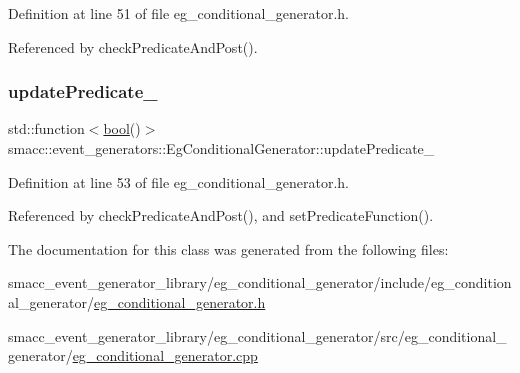 Definition at line 51 of file eg\+\_\+conditional\+\_\+generator.\+h.



Referenced by check\+Predicate\+And\+Post().

\mbox{\label{classsmacc_1_1event__generators_1_1EgConditionalGenerator_a4e4092ecfa7278deda39e8ade6455362}} 
\subsubsection{\texorpdfstring{update\+Predicate\+\_\+}{updatePredicate\_}}
{\footnotesize\ttfamily std\+::function$<$\hyperlink{classbool}{bool}()$>$ smacc\+::event\+\_\+generators\+::\+Eg\+Conditional\+Generator\+::update\+Predicate\+\_\+\hspace{0.3cm}{\ttfamily [private]}}



Definition at line 53 of file eg\+\_\+conditional\+\_\+generator.\+h.



Referenced by check\+Predicate\+And\+Post(), and set\+Predicate\+Function().



The documentation for this class was generated from the following files\+:\begin{DoxyCompactItemize}
\item 
smacc\+\_\+event\+\_\+generator\+\_\+library/eg\+\_\+conditional\+\_\+generator/include/eg\+\_\+conditional\+\_\+generator/\hyperlink{eg__conditional__generator_8h}{eg\+\_\+conditional\+\_\+generator.\+h}\item 
smacc\+\_\+event\+\_\+generator\+\_\+library/eg\+\_\+conditional\+\_\+generator/src/eg\+\_\+conditional\+\_\+generator/\hyperlink{eg__conditional__generator_8cpp}{eg\+\_\+conditional\+\_\+generator.\+cpp}\end{DoxyCompactItemize}

